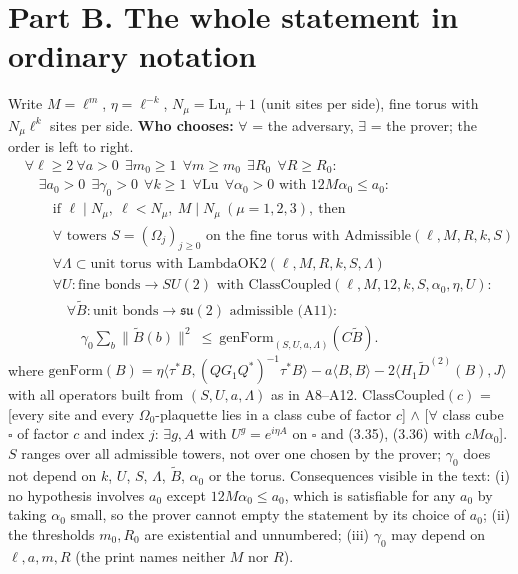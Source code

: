 \documentclass[10pt,a4paper]{article}
\newcommand{\Lu}{\mathrm{Lu}}
\begin{document}
\section*{Part B. The whole statement in ordinary notation}
Write $M=\ell^m$, $\eta=\ell^{-k}$, $N_\mu=\Lu_\mu+1$ (unit sites per side), fine torus with $N_\mu\ell^k$ sites per side. \textbf{Who chooses:} $\forall$ = the adversary, $\exists$ = the prover; the order is left to right.
\begin{align*}
&\forall \ell\ge2\ \forall a>0\ \ \exists m_0\ge1\ \ \forall m\ge m_0\ \ \exists R_0\ \ \forall R\ge R_0:\\
&\quad \exists a_0>0\ \ \exists\gamma_0>0\ \ \forall k\ge1\ \ \forall\Lu\ \ \forall\alpha_0>0\text{ with }12M\alpha_0\le a_0:\\
&\quad\quad\text{if }\ell\mid N_\mu,\ \ell<N_\mu,\ M\mid N_\mu\ (\mu=1,2,3),\ \text{then}\\
&\quad\quad\forall\text{ towers }S=(\Omega_j)_{j\ge0}\text{ on the fine torus with }\mathrm{Admissible}(\ell,M,R,k,S)\\&\quad\quad\forall\Lambda\subset\text{unit torus with }\mathrm{LambdaOK2}(\ell,M,R,k,S,\Lambda)\\
&\quad\quad\forall U:\text{fine bonds}\to SU(2)\text{ with }\mathrm{ClassCoupled}(\ell,M,12,k,S,\alpha_0,\eta,U):\\
&\quad\quad\quad\forall\tilde B:\text{unit bonds}\to\mathfrak{su}(2)\text{ admissible (A11)}:\\&\quad\quad\quad\quad \gamma_0\sum_b\|\tilde B(b)\|^2\ \le\ \mathrm{genForm}_{(S,U,a,\Lambda)}(C\tilde B).
\end{align*}
where $\mathrm{genForm}(B)=\eta\langle\tau^*B,(QG_1Q^*)^{-1}\tau^*B\rangle-a\langle B,B\rangle-2\langle H_1\tilde D^{(2)}(B),J\rangle$ with all operators built from $(S,U,a,\Lambda)$ as in A8--A12. $\mathrm{ClassCoupled}(c)$ = [every site and every $\Omega_0$-plaquette lies in a class cube of factor $c$] $\wedge$ [$\forall$ class cube $\square$ of factor $c$ and index $j$: $\exists g,A$ with $U^g=e^{i\eta A}$ on $\square$ and (3.35), (3.36) with $cM\alpha_0$]. $S$ ranges over all admissible towers, not over one chosen by the prover; $\gamma_0$ does not depend on $k$, $U$, $S$, $\Lambda$, $\tilde B$, $\alpha_0$ or the torus. Consequences visible in the text: (i) no hypothesis involves $a_0$ except $12M\alpha_0\le a_0$, which is satisfiable for any $a_0$ by taking $\alpha_0$ small, so the prover cannot empty the statement by its choice of $a_0$; (ii) the thresholds $m_0,R_0$ are existential and unnumbered; (iii) $\gamma_0$ may depend on $\ell,a,m,R$ (the print names neither $M$ nor $R$).
\end{document}
